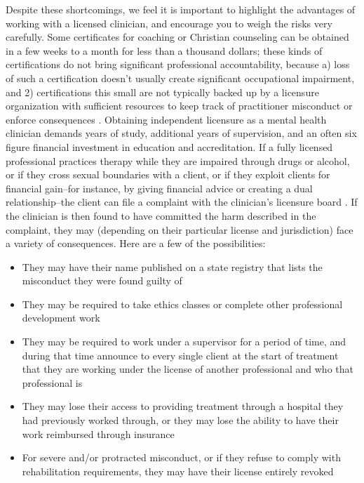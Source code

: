 \documentclass[12pt,letterpaper]{book}
\begin{document}
Despite these shortcomings, we feel it is important to highlight the advantages of working with a licensed clinician, and encourage you to weigh the risks very carefully. Some certificates for coaching or Christian counseling can be obtained in a few weeks to a month for less than a thousand dollars; these kinds of certifications do not bring significant professional accountability, because a) loss of such a certification doesn't usually create significant occupational impairment, and 2) certifications this small are not typically backed up by a licensure organization with sufficient resources to keep track of practitioner misconduct or enforce consequences \cite{carr2015end}. Obtaining independent licensure as a mental health clinician demands years of study, additional years of supervision, and an often six figure financial investment in education and accreditation. If a fully licensed professional practices therapy while they are impaired through drugs or alcohol, or if they cross sexual boundaries with a client, or if they exploit clients for financial gain–for instance, by giving financial advice or creating a dual relationship–the client can file a complaint with the clinician's licensure board \cite{vinson1987complaintProcedures,barsky2023licensing}. If the clinician is then found to have committed the harm described in the complaint, they may (depending on their particular license and jurisdiction) face a variety of consequences. Here are a few of the possibilities:
\begin{itemize}
    \item They may have their name published on a state registry that lists the misconduct they were found guilty of
    \item They may be required to take ethics classes or complete other professional development work
    \item They may be required to work under a supervisor for a period of time, and during that time announce to every single client at the start of treatment that they are working under the license of another professional and who that professional is
    \item They may lose their access to providing treatment through a hospital they had previously worked through, or they may lose the ability to have their work reimbursed through insurance 
    \item For severe and/or protracted misconduct, or if they refuse to comply with rehabilitation requirements, they may have their license entirely revoked
\end{itemize}
\end{document}
